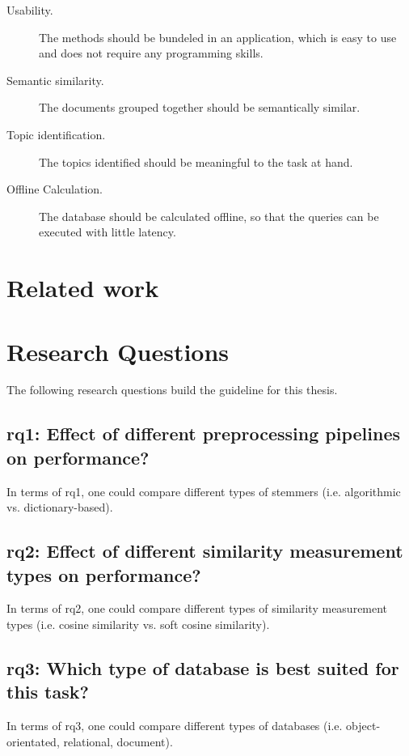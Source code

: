 \begin{description}
    \item[Usability.]
    The methods should be bundeled in an application, which is easy to use and does not require any programming skills.
    \item[Semantic similarity.]
    The documents grouped together should be semantically similar.
    \item[Topic identification.]
    The topics identified should be meaningful to the task at hand.  
    \item[Offline Calculation.]
    The database should be calculated offline, so that the queries can be executed with little latency.
\end{description}


\section{Related work}\label{sec:related-work}


\section{Research Questions}\label{sec:research-questions}
The following research questions build the guideline for this thesis.

\subsection[\acs{rq}1]{\ac{rq}1: Effect of different preprocessing pipelines on performance?}\label{subsec:rq1}
In terms of \ac{rq}1, one could compare different types of stemmers (i.e. algorithmic vs. dictionary-based).

\subsection[\acs{rq}2]{\ac{rq}2: Effect of different similarity measurement types on performance?}\label{subsec:rq2}
In terms of \ac{rq}2, one could compare different types of similarity measurement types (i.e. cosine similarity vs. soft cosine similarity).

\subsection[\acs{rq}3]{\ac{rq}3: Which type of database is best suited for this task?}\label{subsec:rq3}
In terms of \ac{rq}3, one could compare different types of databases (i.e. object-orientated, relational, document).

